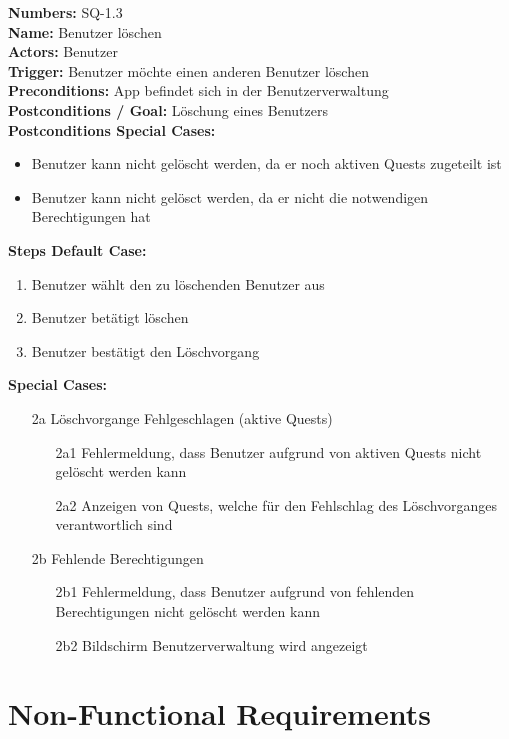 \documentclass{article}
\begin{document}
    \textbf{Numbers:} SQ-1.3\\
    \textbf{Name:} Benutzer löschen\\
    \textbf{Actors:} Benutzer\\
    \textbf{Trigger:} Benutzer möchte einen anderen Benutzer löschen\\
    \textbf{Preconditions:}  App befindet sich in der Benutzerverwaltung\\
    \textbf{Postconditions / Goal:} Löschung eines Benutzers\\
    \textbf{Postconditions Special Cases:}
    \begin{itemize}
        \item Benutzer kann nicht gelöscht werden, da er noch aktiven Quests zugeteilt ist
        \item Benutzer kann nicht gelösct werden, da er nicht die notwendigen Berechtigungen hat
    \end{itemize}
    \textbf{Steps Default Case:} 
    \begin{enumerate}
        \item Benutzer wählt den zu löschenden Benutzer aus
        \item Benutzer betätigt löschen
        \item Benutzer bestätigt den Löschvorgang
    \end{enumerate}
\textbf{Special Cases:}
\begin{itemize}
    \item [2a] Löschvorgange Fehlgeschlagen (aktive Quests)
    \begin{itemize}
        \item [2a1] Fehlermeldung, dass Benutzer aufgrund von aktiven Quests nicht gelöscht werden kann
        \item [2a2] Anzeigen von Quests, welche für den Fehlschlag des Löschvorganges verantwortlich sind
    \end{itemize}
    \item [2b] Fehlende Berechtigungen
    \begin{itemize}
        \item [2b1] Fehlermeldung, dass Benutzer aufgrund von fehlenden Berechtigungen nicht gelöscht werden kann
        \item [2b2] Bildschirm Benutzerverwaltung wird angezeigt
    \end{itemize}
\end{itemize}

\section{Non-Functional Requirements}
\end{document}
